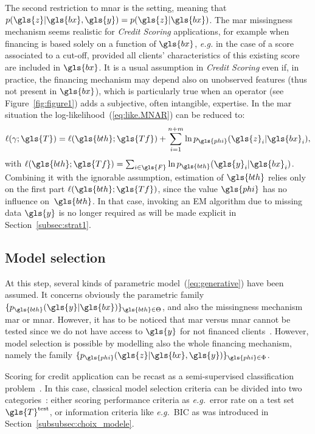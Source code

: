 The second restriction to \gls{mnar} is the  setting, meaning that $p(\gls{z}| \gls{bx},\gls{y}) = p(\gls{z}|\gls{bx})$. The \gls{mar} missingness mechanism seems realistic for \textit{Credit Scoring} applications, for example when financing is based solely on a function of $\gls{bx}$, {\it e.g.} in the case of a score associated to a cut-off, provided all clients' characteristics of this existing \gls{score} are included in $\gls{bx}$. It is a usual assumption in \textit{Credit Scoring} even if, in practice, the financing mechanism may depend also on unobserved features (thus not present in $\gls{bx}$), which is particularly true when an operator (see Figure~\ref{fig:figure1}) adds a subjective, often intangible, expertise. In the \gls{mar} situation the log-likelihood~(\ref{eq:like.MNAR}) can be reduced to:
\begin{equation}\label{eq:like.MAR}
\ell(\gamma;\gls{T}) = \ell(\gls{bth};\gls{Tf}) + \sum_{i=1}^{n+m} \ln p_{\gls{phi}}(\gls{z}_{i} | \gls{bx}_{i}),
\end{equation}
with $\ell(\gls{bth};\gls{Tf})=\sum_{i\in\gls{F}}\ln p_{\gls{bth}}(\gls{y}_i | \gls{bx}_i)$.
Combining it with the ignorable assumption, estimation of $\gls{bth}$ relies only on the first part $\ell(\gls{bth};\gls{Tf})$, since the value $\gls{phi}$ has no influence on~$\gls{bth}$. In that case, invoking an EM algorithm due to missing data $\gls{y}$ is no longer required as will be made explicit in Section~\ref{subsec:strat1}.

\subsection{Model selection} \label{subsec:model_selection}

At this step, several kinds of parametric model~(\ref{eq:generative}) have been assumed. It concerns obviously the parametric family $\{p_{\gls{bth}}(\gls{y}|\gls{bx})\}_{\gls{bth} \in\Theta}$, and also the missingness mechanism \gls{mar} or \gls{mnar}. 
However, it has to be noticed that \gls{mar} versus \gls{mnar} cannot be tested since we do not have access to $\gls{y}$ for not financed clients~\cite{molenberghs2008every}. However, model selection is possible by modelling also the whole financing mechanism, namely the family $\{p_{\gls{phi}}(\gls{z}|\gls{bx},\gls{y})\}_{\gls{phi} \in \Phi}$.


Scoring for credit application can be recast as a semi-supervised classification problem~\cite{Chapelle:2010:SL:1841234}. In this case, classical model selection criteria can be divided into two categories~\cite{vandewalle:tel-00447141}: either scoring performance criteria as \textit{e.g.}\ error rate on a test set $\gls{T}^{\text{test}}$, or information criteria like \textit{e.g.}\ BIC as was introduced in Section~\ref{subsubsec:choix_modele}.

